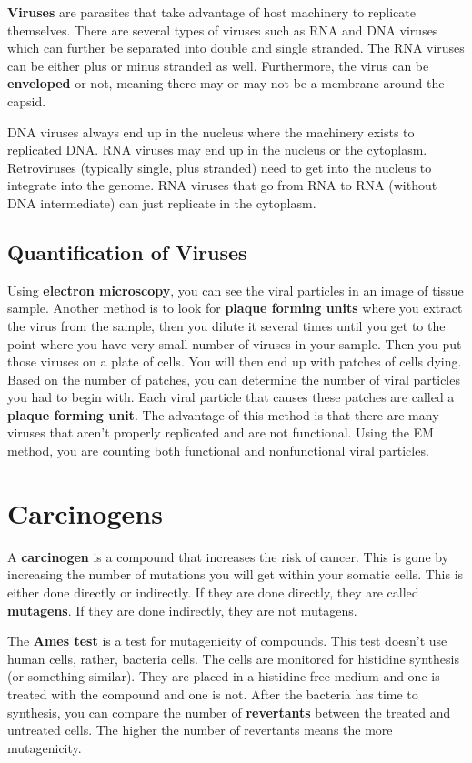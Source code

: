 \documentclass{article}
\begin{document}
\textbf{Viruses} are parasites that take advantage of host machinery to
replicate themselves. There are several types of viruses such as RNA and DNA
viruses which can further be separated into double and single stranded. The RNA
viruses can be either plus or minus stranded as well. Furthermore, the virus can
be \textbf{enveloped} or not, meaning there may or may not be a membrane around
the capsid. 

DNA viruses always end up in the nucleus where the machinery exists to
replicated DNA. RNA viruses may end up in the nucleus or the cytoplasm.
Retroviruses (typically single, plus stranded) need to get into the nucleus to
integrate into the genome. RNA viruses that go from RNA to RNA (without DNA
intermediate) can just replicate in the cytoplasm. 

\subsection{ Quantification of Viruses }

Using \textbf{electron microscopy}, you can see the viral particles in an image
of tissue sample. Another method is to look for \textbf{plaque forming units}
where you extract the virus from the sample, then you dilute it several times
until you get to the point where you have very small number of viruses in your
sample. Then you put those viruses on a plate of cells. You will then end up
with patches of cells dying. Based on the number of patches, you can determine
the number of viral particles you had to begin with. Each viral particle that
causes these patches are called a \textbf{plaque forming unit}. The advantage of
this method is that there are many viruses that aren't properly replicated and
are not functional. Using the EM method, you are counting both functional and
nonfunctional viral particles.

\section{ Carcinogens }

A \textbf{carcinogen} is a compound that increases the risk of cancer. This is
gone by increasing the number of mutations you will get within your somatic
cells. This is either done directly or indirectly. If they are done directly,
they are called \textbf{mutagens}. If they are done indirectly, they are not
mutagens. 

The \textbf{Ames test} is a test for mutagenieity of compounds. This test
doesn't use human cells, rather, bacteria cells. The cells are monitored for
histidine synthesis (or something similar). They are placed in a histidine free
medium and one is treated with the compound and one is not. After the bacteria
has time to synthesis, you can compare the number of \textbf{revertants} between
the treated and untreated cells. The higher the number of revertants means the
more mutagenicity.
\end{document}
